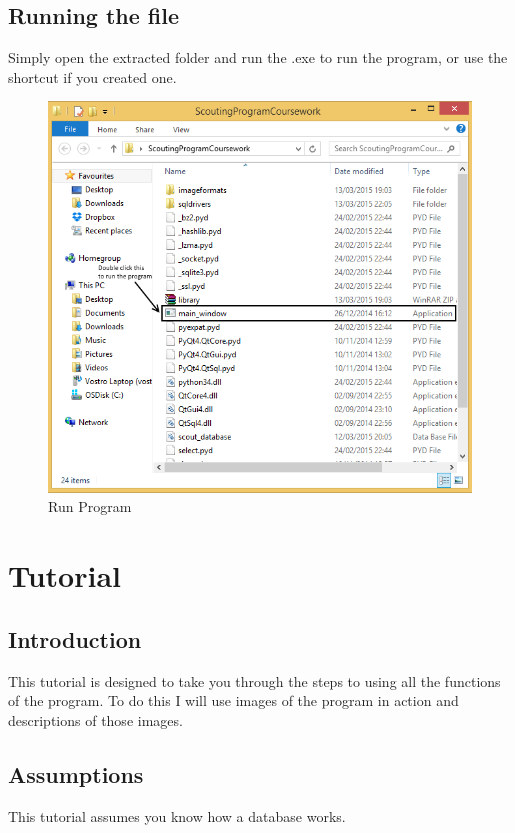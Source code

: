 \subsection{Running the file}

Simply open the extracted folder and run the .exe to run the program, or use the shortcut if you created one.

\begin{figure}[H]
	\includegraphics[width=\textwidth]{./Manual/Images/RunProgram.png}
	\caption{Run Program} \label{fig:run_program}
\end{figure}

\section{Tutorial}

\subsection{Introduction}
This tutorial is designed to take you through the steps to using all the functions of the program. To do this I will use images of the program in action and descriptions of those images.

\subsection{Assumptions}
This tutorial assumes you know how a database works.

